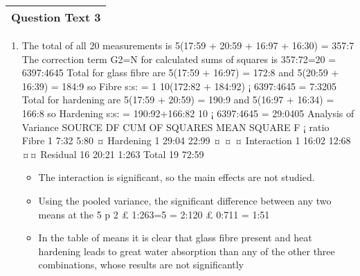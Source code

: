 \documentclass[a4paper,12pt]{article}
\begin{document}
\begin{table}[ht!]
 \centering
 \begin{tabular}{|p{15cm}|}
 \hline  
Question Text 3 
\\ \hline
  \end{tabular}
\end{table}\begin{enumerate}
    \item The total of all 20 measurements is 5(17:59 + 20:59 + 16:97 + 16:30) = 357:7 The correction
term G2=N for calculated sums of squares is 357:72=20 = 6397:4645 Total for glass fibre are
5(17:59 + 16:97) = 172:8 and 5(20:59 + 16:39) = 184:9 so Fibre s:s: = 1
10(172:82 + 184:92) ¡
6397:4645 = 7:3205 Total for hardening are 5(17:59 + 20:59) = 190:9 and 5(16:97 + 16:34) =
166:8 so Hardening s:s: = 190:92+166:82
10 ¡ 6397:4645 = 29:0405
Analysis of Variance
SOURCE DF CUM OF SQUARES MEAN SQUARE F ¡ ratio
Fibre 1 7:32 5:80 ¤
Hardening 1 29:04 22:99 ¤ ¤ ¤
Interaction 1 16:02 12:68 ¤¤
Residual 16 20:21 1:263
Total 19 72:59
\begin{itemize}
    \item The interaction is significant, so the main effects are not studied. 
    \item Using the pooled variance,
the significant difference between any two means at the 5%
p
2 £ 1:263=5 =
2:120 £ 0:711 = 1:51
\item In the table of means it is clear that glass fibre present and heat hardening leads to great
water absorption than any of the other three combinations, whose results are not significantly
\end{itemize}


\end{enumerate}
\end{document}
